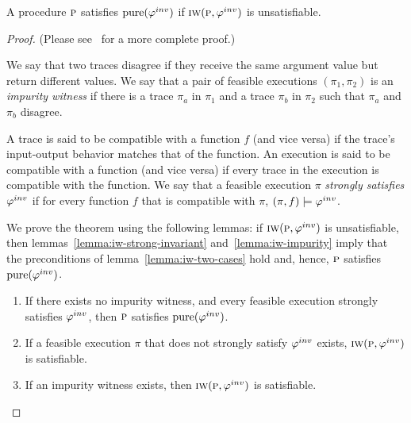 \begin{theorem}
A procedure $\textsc{p}$ satisfies  $\mathrm{pure}(\varphi^{inv})$ if $\textsc{iw}(\textsc{p}, \varphi^{inv})$ is unsatisfiable.
\end{theorem}

\begin{proof}
(Please see~\cite{CheckingOP:arxiv} for a more complete proof.)

We say that two traces disagree if they receive the same argument value but return different values.
We say that a pair of feasible executions $(\pi_1, \pi_2)$ is an \emph{impurity witness} if there is a trace
$\pi_a$ in $\pi_1$ and a trace $\pi_b$ in $\pi_2$ such that $\pi_a$ and $\pi_b$ disagree.

A trace is said to be compatible with a function $f$ (and vice versa) if the trace's input-output behavior matches that of the function.
An execution is said to be compatible with a function (and vice versa) if every trace in the execution is compatible with the function.
We say that a feasible execution $\pi$ \emph{strongly satisfies} $\varphi^{inv}$ if for every function $f$ that is compatible with $\pi$, $(\pi,f) \models \varphi^{inv}$.

We prove the theorem using the following lemmas:
if $\textsc{iw}(\textsc{p}, \varphi^{inv})$ is unsatisfiable, then lemmas~\ref{lemma:iw-strong-invariant} and~\ref{lemma:iw-impurity} imply
that the preconditions of lemma~\ref{lemma:iw-two-cases} hold and, hence, $\textsc{p}$ satisfies $\mathrm{pure}(\varphi^{inv})$.
\begin{enumerate}
\item \label{lemma:iw-two-cases}
If there exists no impurity witness, and every feasible execution strongly satisfies $\varphi^{inv}$, then $\textsc{p}$ satisfies $\mathrm{pure}(\varphi^{inv})$.

\item \label{lemma:iw-strong-invariant}
If a feasible execution $\pi$ that does not strongly satisfy $\varphi^{inv}$ exists, $\textsc{iw}(\textsc{p}, \varphi^{inv})$ is satisfiable.

\item \label{lemma:iw-impurity}
If an impurity witness exists, then $\textsc{iw}(\textsc{p}, \varphi^{inv})$ is satisfiable.
\end{enumerate}



\end{proof}

